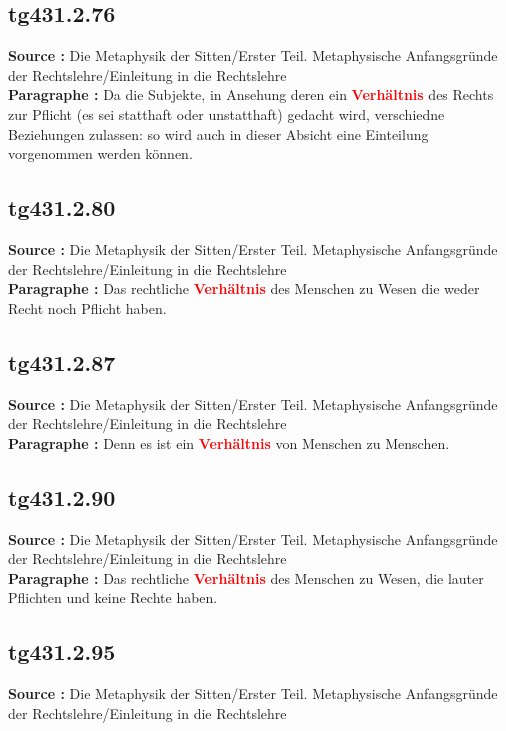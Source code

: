 \documentclass[a4paper,12pt,twoside]{book}
\newcommand{\match}[1]{\textcolor{red}{\textbf{#1}}}
\begin{document}
	\subsection*{tg431.2.76} 
	\textbf{Source : }Die Metaphysik der Sitten/Erster Teil. Metaphysische Anfangsgründe der Rechtslehre/Einleitung in die Rechtslehre\\  
	
	\textbf{Paragraphe : }Da die Subjekte, in Ansehung deren ein \match{Verhältnis} des Rechts zur Pflicht (es sei statthaft oder unstatthaft) gedacht wird, verschiedne Beziehungen zulassen: so wird auch in dieser Absicht eine Einteilung vorgenommen werden können. 
	
	\subsection*{tg431.2.80} 
	\textbf{Source : }Die Metaphysik der Sitten/Erster Teil. Metaphysische Anfangsgründe der Rechtslehre/Einleitung in die Rechtslehre\\  
	
	\textbf{Paragraphe : }Das rechtliche \match{Verhältnis} des Menschen zu Wesen die weder Recht noch Pflicht haben. 
	
	\subsection*{tg431.2.87} 
	\textbf{Source : }Die Metaphysik der Sitten/Erster Teil. Metaphysische Anfangsgründe der Rechtslehre/Einleitung in die Rechtslehre\\  
	
	\textbf{Paragraphe : }Denn es ist ein \match{Verhältnis} von Menschen zu Menschen. 
	
	\subsection*{tg431.2.90} 
	\textbf{Source : }Die Metaphysik der Sitten/Erster Teil. Metaphysische Anfangsgründe der Rechtslehre/Einleitung in die Rechtslehre\\  
	
	\textbf{Paragraphe : }Das rechtliche \match{Verhältnis} des Menschen zu Wesen, die lauter Pflichten und keine Rechte haben. 
	
	\subsection*{tg431.2.95} 
	\textbf{Source : }Die Metaphysik der Sitten/Erster Teil. Metaphysische Anfangsgründe der Rechtslehre/Einleitung in die Rechtslehre\\  
	
\end{document}
